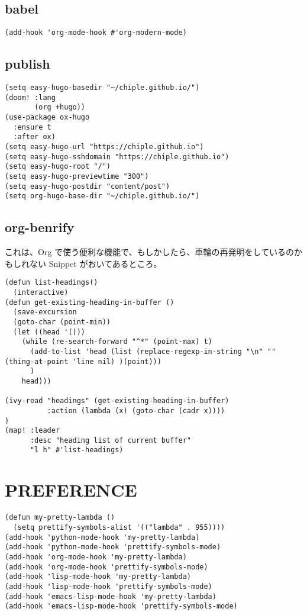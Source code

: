 \documentclass[11pt]{article}
\begin{document}
\subsection{babel}
\label{sec:org240fe9e}
\begin{verbatim}
(add-hook 'org-mode-hook #'org-modern-mode)
\end{verbatim}


\subsection{publish}
\label{sec:orgb69bc40}
\begin{verbatim}
(setq easy-hugo-basedir "~/chiple.github.io/")
(doom! :lang
       (org +hugo))
(use-package ox-hugo
  :ensure t
  :after ox)
(setq easy-hugo-url "https://chiple.github.io")
(setq easy-hugo-sshdomain "https://chiple.github.io")
(setq easy-hugo-root "/")
(setq easy-hugo-previewtime "300")
(setq easy-hugo-postdir "content/post")
(setq org-hugo-base-dir "~/chiple.github.io/")
\end{verbatim}

\subsection{org-benrify}
\label{sec:org3ec530b}
これは、Org で使う便利な機能で、もしかしたら、車輪の再発明をしているのかもしれない
Snippet がおいてあるところ。
\begin{verbatim}
(defun list-headings()
  (interactive)
(defun get-existing-heading-in-buffer ()
  (save-excursion
  (goto-char (point-min))
  (let ((head '()))
    (while (re-search-forward "^*" (point-max) t)
      (add-to-list 'head (list (replace-regexp-in-string "\n" "" (thing-at-point 'line nil) )(point)))
      )
    head)))

(ivy-read "headings" (get-existing-heading-in-buffer)
          :action (lambda (x) (goto-char (cadr x))))
)
(map! :leader
      :desc "heading list of current buffer"
      "l h" #'list-headings)
\end{verbatim}

\section{PREFERENCE}
\label{sec:orgdc3565e}
\begin{verbatim}
(defun my-pretty-lambda ()
  (setq prettify-symbols-alist '(("lambda" . 955))))
(add-hook 'python-mode-hook 'my-pretty-lambda)
(add-hook 'python-mode-hook 'prettify-symbols-mode)
(add-hook 'org-mode-hook 'my-pretty-lambda)
(add-hook 'org-mode-hook 'prettify-symbols-mode)
(add-hook 'lisp-mode-hook 'my-pretty-lambda)
(add-hook 'lisp-mode-hook 'prettify-symbols-mode)
(add-hook 'emacs-lisp-mode-hook 'my-pretty-lambda)
(add-hook 'emacs-lisp-mode-hook 'prettify-symbols-mode)
\end{verbatim}
\end{document}
